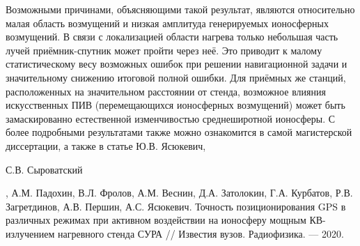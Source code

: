 \documentclass[a4paper,14pt]{extarticle}
\begin{document}
Возможными причинами, объясняющими такой результат, являются относительно малая область возмущений и низкая амплитуда генерируемых ионосферных возмущений.
В связи с локализацией области нагрева только небольшая часть лучей приёмник-спутник может пройти через неё.
Это приводит к малому статистическому весу возможных ошибок при решении навигационной задачи и значительному снижению итоговой полной ошибки.
Для приёмных же станций, расположенных на значительном расстоянии от стенда, возможное влияния искусственных ПИВ (перемещающихся ионосферных возмущений) может быть замаскированно естественной изменчивостью среднеширотной ионосферы. 
С более подробными результатами также можно ознакомится в самой магистерской диссертации, а также в статье Ю.В. Ясюкевич, \begin{bf}С.В. Сыроватский\end{bf}, А.М. Падохин, В.Л. Фролов, А.М. Веснин, Д.А. Затолокин, Г.А. Курбатов, Р.В. Загретдинов, А.В. Першин, А.С. Ясюкевич. Точность позиционирования GPS в различных режимах при активном воздействии на ионосферу мощным КВ-излучением нагревного стенда СУРА // Известия вузов. Радиофизика. --- 2020.
\end{document}
